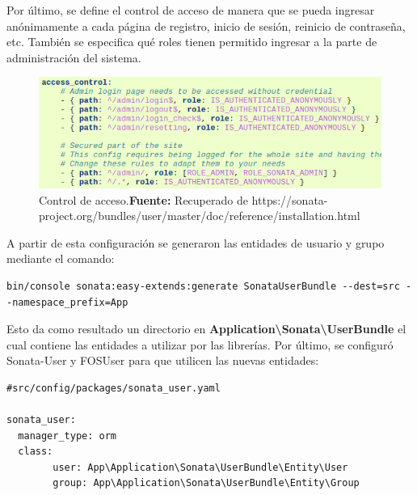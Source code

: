 \newpage
Por último, se define el control de acceso de manera que se pueda ingresar anónimamente a cada página de registro, inicio de sesión, reinicio de contraseña,
etc.
También se especifica qué roles tienen permitido ingresar a la parte de administración del sistema.

\begin{figure}[H]
    \includegraphics[width=1\linewidth]{image/acl.png}
    \caption[Control de acceso]{Control de acceso.\newline \textbf{Fuente:} Recuperado de https://sonata-project.org/bundles/user/master/doc/reference/installation.html}
    \label{fig:image/acl}
\end{figure}


A partir de esta configuración se generaron las entidades de usuario y grupo mediante el comando:

\begin{lstlisting}
bin/console sonata:easy-extends:generate SonataUserBundle --dest=src --namespace_prefix=App
\end{lstlisting}


Esto da como resultado un directorio en \textbf{Application\textbackslash Sonata\textbackslash UserBundle} el cual contiene las entidades a utilizar por las librerías.
Por último, se configuró Sonata-User y FOSUser para que utilicen las nuevas entidades:

\newpage
\begin{lstlisting}[caption={Archivo de configuración de Sonata-User.\\Fuente: \sonatainstallation}]
#src/config/packages/sonata_user.yaml

sonata_user:
  manager_type: orm
  class:
        user: App\Application\Sonata\UserBundle\Entity\User
        group: App\Application\Sonata\UserBundle\Entity\Group

\end{lstlisting}

